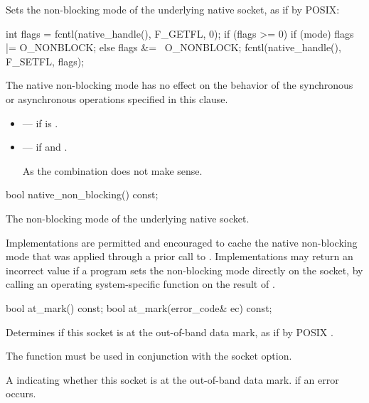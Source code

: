 \begin{itemdescr}
\pnum
\effects Sets the non-blocking mode of the underlying native socket, as if by POSIX:
\begin{codeblock}
int flags = fcntl(native_handle(), F_GETFL, 0);
if (flags >= 0)
{
  if (mode)
    flags |= O_NONBLOCK;
  else
    flags &= ~O_NONBLOCK;
  fcntl(native_handle(), F_SETFL, flags);
}
\end{codeblock}


\pnum
 The native non-blocking mode has no effect on the behavior of the synchronous or asynchronous operations specified in this clause.

\pnum
\errors
\begin{itemize}
\item
{} --- if  is .
\item
{} --- if  and . \begin{note} As the combination does not make sense. \end{note}
\end{itemize}
\end{itemdescr}

\begin{itemdecl}
bool native_non_blocking() const;
\end{itemdecl}

\begin{itemdescr}
\pnum
\returns The non-blocking mode of the underlying native socket.

\pnum
\remarks Implementations are permitted and encouraged to cache the native non-blocking mode that was applied through a prior call to . Implementations may return an incorrect value if a program sets the non-blocking mode directly on the socket, by calling an operating system-specific function on the result of .
\end{itemdescr}

\begin{itemdecl}
bool at_mark() const;
bool at_mark(error_code& ec) const;
\end{itemdecl}

\begin{itemdescr}
\pnum
\effects Determines if this socket is at the out-of-band data mark, as if by POSIX . \begin{note} The  function must be used in conjunction with the  socket option. \end{note}

\pnum
\returns A  indicating whether this socket is at the out-of-band data mark.  if an error occurs.
\end{itemdescr}

